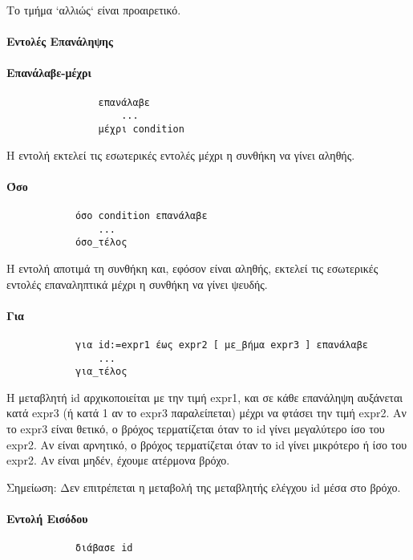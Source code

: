 \documentclass[12pt,a4paper]{article}
\begin{document}
        Το τμήμα `αλλιώς` είναι προαιρετικό.
    \paragraph{Εντολές Επανάληψης}

    \paragraph{Επανάλαβε-μέχρι}
        \begin{verbatim}
                επανάλαβε
                    ...
                μέχρι condition
            \end{verbatim}
        Η εντολή εκτελεί τις εσωτερικές εντολές μέχρι η συνθήκη να γίνει αληθής.

    \paragraph{Όσο}
        \begin{verbatim}
            όσο condition επανάλαβε
                ...
            όσο_τέλος
        \end{verbatim}
        Η εντολή αποτιμά τη συνθήκη και, εφόσον είναι αληθής, εκτελεί τις εσωτερικές εντολές επαναληπτικά μέχρι η συνθήκη να γίνει ψευδής.

    \paragraph{Για}
        \begin{verbatim}
            για id:=expr1 έως expr2 [ με_βήμα expr3 ] επανάλαβε
                ...
            για_τέλος
        \end{verbatim}
        Η μεταβλητή id αρχικοποιείται με την τιμή expr1, και σε κάθε επανάληψη αυξάνεται κατά expr3 (ή κατά 1 αν το expr3 παραλείπεται) μέχρι να φτάσει την τιμή expr2. Αν το expr3 είναι θετικό, ο βρόχος τερματίζεται όταν το id γίνει μεγαλύτερο ίσο του expr2. Αν είναι αρνητικό, ο βρόχος τερματίζεται όταν το id γίνει μικρότερο ή ίσο του expr2. Αν είναι μηδέν, έχουμε ατέρμονα βρόχο.


        Σημείωση: Δεν επιτρέπεται η μεταβολή της μεταβλητής ελέγχου id μέσα στο βρόχο.
    \paragraph{Εντολή Εισόδου}

        \begin{verbatim}
            διάβασε id
        \end{verbatim}
\end{document}
